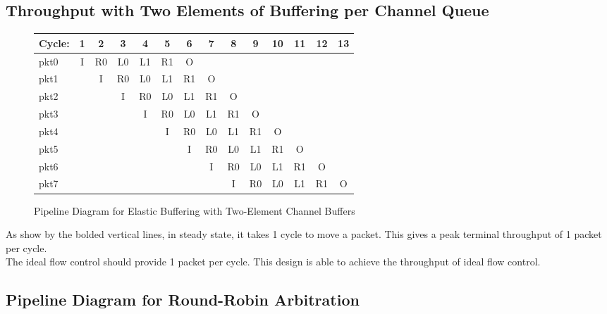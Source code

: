 \documentclass[10pt]{article}
\begin{document}
\subsection{Throughput with Two Elements of Buffering per Channel Queue}

\begin{figure}[H]
\centering
{\setlength{\tabcolsep}{2pt}
\begin{tabular}{|l|c|c|c|c|c|c|c|c|c!{\vrule width 1.5pt}c!{\vrule width 1.5pt}c!{\vrule width 1.5pt}c!{\vrule width 1.5pt}c|}
\hline
Cycle: & 1  & 2  & 3  & 4  & 5  & 6  & 7  & 8  & 9  & 10 & 11 & 12 & 13 \\ \hline
pkt0   & I  & R0 & L0 & L1 & R1 & O  &    &    &    &    &    &    &    \\ \hline
pkt1   &    & I  & R0 & L0 & L1 & R1 & O  &    &    &    &    &    &    \\ \hline
pkt2   &    &    & I  & R0 & L0 & L1 & R1 & O  &    &    &    &    &    \\ \hline
pkt3   &    &    &    & I  & R0 & L0 & L1 & R1 & O  &    &    &    &    \\ \hline
pkt4   &    &    &    &    & I  & R0 & L0 & L1 & R1 & O  &    &    &    \\ \hline
pkt5   &    &    &    &    &    & I  & R0 & L0 & L1 & R1 & O  &    &    \\ \hline
pkt6   &    &    &    &    &    &    & I  & R0 & L0 & L1 & R1 & O  &    \\ \hline
pkt7   &    &    &    &    &    &    &    & I  & R0 & L0 & L1 & R1 & O  \\ \hline
\end{tabular}
}
\caption{Pipeline Diagram for Elastic Buffering with Two-Element Channel Buffers}
\end{figure}
As show by the bolded vertical lines, in steady state, it takes 1 cycle to move a packet. This gives a peak terminal throughput of 1 packet per cycle.\\
The ideal flow control should provide 1 packet per cycle. This design is able to achieve the throughput of ideal flow control.

\subsection{Pipeline Diagram for Round-Robin Arbitration}
\end{document}
